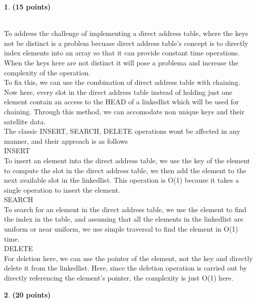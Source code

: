 \documentclass[11pt]{article}
\theoremstyle{definition}
\newtheorem{prob}{}
\newcommand{\solution}{\medskip\noindent{\color{DarkBlue}\textbf{Solution:}}}
\begin{document}
\begin{prob} \textbf{(15 points)}
\end{prob}

\solution \\

To address the challenge of implementing a direct address table, where the keys not be distinct is a problem becuase direct address table's concept is to directly index elements into an array
so that it can provide constant time operations. When the keys here are not distinct it will pose a problema and increase the complexity of the operation. \\

To fix this, we can use the combination of direct address table with chaining. Now here, every slot in the direct address table instead of holding just one element
contain an access to the HEAD of a linkedlist which will be used for chaining. Through this method, we can accomodate non unique keys and their satellite data. \\

The classic INSERT, SEARCH, DELETE operations wont be affected in any manner, and their approach is as follows\\

INSERT \\

To insert an element into the direct address table, we use the key of the element to compute the slot in the direct address table, we then add the element
to the next available slot in the linkedlist. This operation is O(1) because it takes a single operation to insert the element.\\

SEARCH \\

To search for an element in the direct address table, we use the element to find the index in the table, and assuming that all
the elements in the linkedlist are uniform or near uniform, we use simple traversal to find the element in O(1) time.\\

DELETE \\

For deletion here, we can use the pointer of the element, not the key and directly delete it from the linkedlist. Here, since the deletion
operation is carried out by directly referencing the element's pointer, the complexity is just O(1) here. \\

\begin{prob} \textbf{(20 points)}
\end{prob}
\end{document}

